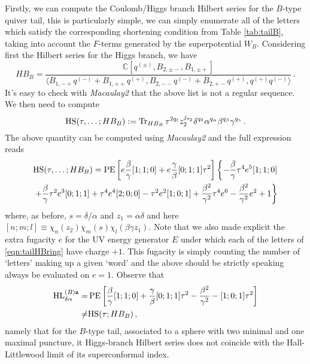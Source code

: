 \documentclass[main.tex]{subfiles}
\begin{document}
Firstly, we can compute the Coulomb/Higgs branch Hilbert series for the $B$-type quiver tail, this is particularly simple, we can simply enumerate all of the letters which satisfy the corresponding shortening condition from Table \ref{tab:tailB}, taking into account the $F$-terms generated by the superpotential $W_B$. Considering first the Hilbert series for the Higgs branch, we have
\begin{equation}\label{eqn:tailHBring}
HB_B=\frac{\mathbb{C}[q^{(\pm)},B_{2,\pm-},B_{1,\pm+}]}{\langle B_{1,-+}q^{(-)}+B_{1,++}q^{(+)},B_{2,--}q^{(-)}+B_{2,+-}q^{(+)},q^{(+)}q^{(-)}\rangle}\,.
\end{equation}
It's easy to check with \textit{Macaulay2} that the above list is not a regular sequence.
We then need to compute
\begin{equation}
\textrm{HS}(\tau,\dots;HB_B):=\operatorname{Tr}_{HB_B}\tau^{2q_t}z_2^{j_{z_2}}\delta^{q_{\delta}}\alpha^{q_{\alpha}}\beta^{q_{\beta}}\gamma^{q_{\gamma}}\,.
\end{equation}
The above quantity can be computed using \textit{Macaulay2} and the full expression reads
\begin{equation}
\begin{aligned}
&\textrm{HS}(\tau,\dots;HB_B)=\operatorname{\mathrm{PE}}\left[e\frac{\beta}{\gamma}[1;1;0]+e\frac{\gamma}{\beta}[0;1;1]\tau^2\right]\left\{-\frac{\beta}{\gamma}  \tau ^4 e^5 [1;1;0] \right.\\
&\left.+\frac{\beta}{\gamma}  \tau ^2 e^3 [0;1;1]+\tau ^4 e^4 [2;0;0]-\tau ^2 e^2[1;0;1]+\frac{\beta ^2 }{\gamma
   ^2}\tau ^4 e^6-\frac{\beta ^2 }{\gamma ^2}e^2+1\right\}
\end{aligned}
\end{equation}
where, as before, $s=\delta/\alpha$ and $z_1=\alpha\delta$ and here $[n;m;l]\equiv\chi_n(z_2)\chi_m(s)\chi_l(\beta\gamma z_1)$. Note that we also made explicit the extra fugacity $e$ for the UV energy generator $E$ under which each of the letters of \eqref{eqn:tailHBring} have charge $+1$. This fugacity is simply counting the number of `letters' making up a given `word' and the above should be strictly speaking always be evaluated on $e=1$. Observe that
\begin{equation}
\begin{aligned}
\textrm{HL}^{(B)\mathbf{z}}_{\delta\alpha}=&\operatorname{\mathrm{PE}}\left[\frac{\beta}{\gamma}[1;1;0]+\frac{\gamma}{\beta}[0;1;1]\tau^2-\frac{\beta^2}{\gamma^2}-[1;0;1]\tau^2\right]\\
\neq &\textrm{HS}(\tau;HB_B)\,,
\end{aligned}
\end{equation}
namely that for the $B$-type tail, associated to a sphere with two minimal and one maximal puncture, it Higgs-branch Hilbert series does not coincide with the Hall-Littlewood limit of its superconformal index. 
\end{document}
